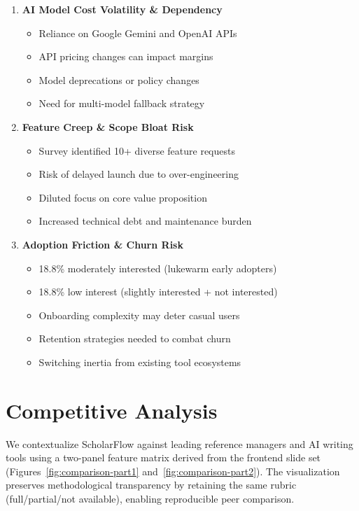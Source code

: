 \begin{enumerate}
    \item \textbf{AI Model Cost Volatility \& Dependency}
          \begin{itemize}
              \item Reliance on Google Gemini and OpenAI APIs
              \item API pricing changes can impact margins
              \item Model deprecations or policy changes
              \item Need for multi-model fallback strategy
          \end{itemize}

    \item \textbf{Feature Creep \& Scope Bloat Risk}
          \begin{itemize}
              \item Survey identified 10+ diverse feature requests
              \item Risk of delayed launch due to over-engineering
              \item Diluted focus on core value proposition
              \item Increased technical debt and maintenance burden
          \end{itemize}

    \item \textbf{Adoption Friction \& Churn Risk}
          \begin{itemize}
              \item 18.8\% moderately interested (lukewarm early adopters)
              \item 18.8\% low interest (slightly interested + not interested)
              \item Onboarding complexity may deter casual users
              \item Retention strategies needed to combat churn
              \item Switching inertia from existing tool ecosystems
          \end{itemize}
\end{enumerate}

\section{Competitive Analysis}

We contextualize ScholarFlow against leading reference managers and AI writing tools using a two-panel feature matrix derived from the frontend slide set (Figures~\ref{fig:comparison-part1} and~\ref{fig:comparison-part2}). The visualization preserves methodological transparency by retaining the same rubric (full/partial/not available), enabling reproducible peer comparison.


